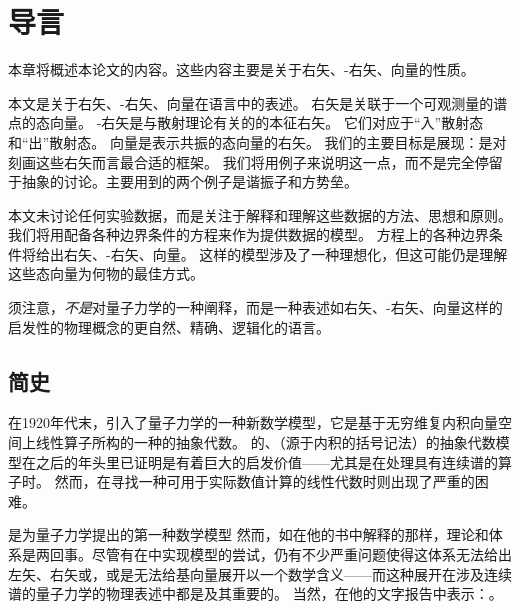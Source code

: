 \chapter{导言}

本章将概述本论文的内容。这些内容主要是关于\dirac 右矢、\lippmann-\schwinger 右矢、\gamow 向量的性质。


本文是关于\dirac 右矢、\lippmann-\schwinger 右矢、\gamow 向量在\rhs 语言中的表述。
\dirac 右矢是关联于一个可观测量的谱点的态向量。
\lippmann-\schwinger 右矢是与散射理论有关的\hamiltonian 的本征右矢。
它们对应于“入”散射态和“出”散射态。
\gamow 向量是表示共振的态向量的右矢。
我们的主要目标是展现：\rhs 是对刻画这些右矢而言最合适的框架。
我们将用例子来说明这一点，而不是完全停留于抽象的讨论。主要用到的两个例子是谐振子和方势垒。

本文未讨论任何实验数据，而是关注于解释和理解这些数据的方法、思想和原则。
我们将用配备各种边界条件的\schrodinger 方程来作为提供数据的模型。
\schrodinger 方程上的各种边界条件将给出\dirac 右矢、\lippmann-\schwinger 右矢、\gamow 向量。
这样的模型涉及了一种理想化，但这可能仍是理解这些态向量为何物的最佳方式。

须注意，\RHS\emph{不是}对量子力学的一种阐释，而是一种表述如\dirac 右矢、\lippmann-\schwinger 右矢、\gamow 向量这样的启发性的物理概念的更自然、精确、逻辑化的语言。

\section{\rhs 简史}

在1920年代末，\dirac 引入了量子力学的一种新数学模型，它是基于无穷维复内积向量空间上线性算子所构的一种的抽象代数。%
\dirac 的、（源于内积的括号记法）的抽象代数模型在之后的年头里已证明是有着巨大的启发价值——尤其是在处理具有连续谱的\hamilton 算子时。
然而，在寻找一种可用于实际数值计算的线性代数时则出现了严重的困难。

是为量子力学提出的第一种数学模型
然而，如\neumann 在他的书中解释的那样，\HS 理论和\dirac 体系是两回事。尽管有在\hs 中实现\dirac 模型的尝试，仍有不少严重问题使得这体系无法给出左矢、右矢或\deltafunc ，或是无法给\dirac 基向量展开以一个数学含义——而这种展开在涉及连续谱的量子力学的物理表述中都是及其重要的。
当然，\dirac 在他的文字报告中表示：。%

